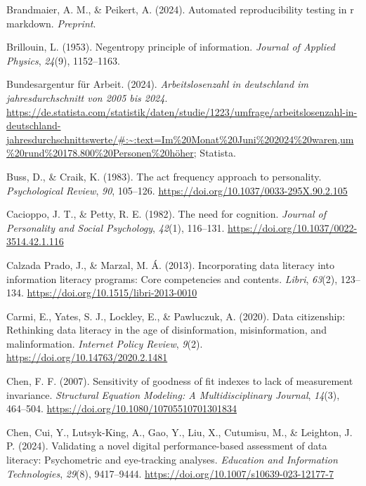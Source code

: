 \documentclass[
  12pt,
  a4paper,
  twoside]{article}
\newlength{\cslhangindent}
\newenvironment{CSLReferences}[2] %
 {\begin{list}{}{%
  \setlength{\itemindent}{0pt}
  \setlength{\leftmargin}{0pt}
  \setlength{\parsep}{0pt}
  \ifodd #1
   \setlength{\leftmargin}{\cslhangindent}
   \setlength{\itemindent}{-1\cslhangindent}
  \fi
  \setlength{\itemsep}{#2\baselineskip}}}
 {\end{list}}
\begin{document}
\begin{CSLReferences}{1}{0}
Brandmaier, A. M., \& Peikert, A. (2024). Automated reproducibility testing in r markdown. \emph{Preprint}.

Brillouin, L. (1953). Negentropy principle of information. \emph{Journal of Applied Physics}, \emph{24}(9), 1152--1163.

Bundesargentur für Arbeit. (2024). \emph{Arbeitslosenzahl in deutschland im jahresdurchschnitt von 2005 bis 2024}. \url{https://de.statista.com/statistik/daten/studie/1223/umfrage/arbeitslosenzahl-in-deutschland-jahresdurchschnittswerte/\#:~:text=Im\%20Monat\%20Juni\%202024\%20waren,um\%20rund\%20178.800\%20Personen\%20höher}; Statista.

Buss, D., \& Craik, K. (1983). The act frequency approach to personality. \emph{Psychological Review}, \emph{90}, 105--126. \url{https://doi.org/10.1037/0033-295X.90.2.105}

Cacioppo, J. T., \& Petty, R. E. (1982). The need for cognition. \emph{Journal of Personality and Social Psychology}, \emph{42}(1), 116--131. \url{https://doi.org/10.1037/0022-3514.42.1.116}

Calzada Prado, J., \& Marzal, M. Á. (2013). Incorporating data literacy into information literacy programs: Core competencies and contents. \emph{Libri}, \emph{63}(2), 123--134. \url{https://doi.org/10.1515/libri-2013-0010}

Carmi, E., Yates, S. J., Lockley, E., \& Pawluczuk, A. (2020). Data citizenship: Rethinking data literacy in the age of disinformation, misinformation, and malinformation. \emph{Internet Policy Review}, \emph{9}(2). \url{https://doi.org/10.14763/2020.2.1481}

Chen, F. F. (2007). Sensitivity of goodness of fit indexes to lack of measurement invariance. \emph{Structural Equation Modeling: A Multidisciplinary Journal}, \emph{14}(3), 464--504. \url{https://doi.org/10.1080/10705510701301834}

Chen, Cui, Y., Lutsyk-King, A., Gao, Y., Liu, X., Cutumisu, M., \& Leighton, J. P. (2024). Validating a novel digital performance-based assessment of data literacy: Psychometric and eye-tracking analyses. \emph{Education and Information Technologies}, \emph{29}(8), 9417--9444. \url{https://doi.org/10.1007/s10639-023-12177-7}


\end{CSLReferences}
\end{document}
